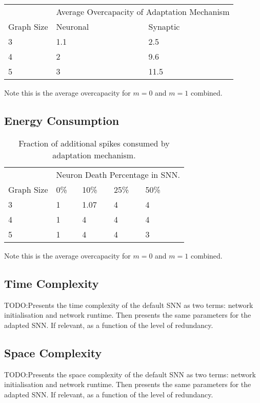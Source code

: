 \begin{table}[H]
\begin{tabular}{lll}
           & \multicolumn{2}{l}{Average Overcapacity of Adaptation Mechanism} \\ \cmidrule{2-3}
           Graph Size & Neuronal     & Synaptic                   \\ \hline 
3       & 1.1          & 2.5                        \\
4      & 2            & 9.6                          \\
5      & 3            & 11.5                         
\end{tabular}
\end{table}
Note this is the average overcapacity for $m=0$ and $m=1$ combined.

\subsection{Energy Consumption}\label{subsec:results_energy_consumption}
\begin{table}[H]
\caption{Fraction of additional spikes consumed by adaptation mechanism.}
\begin{tabular}{llllll}
           & \multicolumn{5}{l}{Neuron Death Percentage in SNN.} \\ \cmidrule{2-6} %
          Graph Size & 0\%    & 10\%    & 25\%    & 50\% \\ \hline
3      & 1    & 1.07     & 4       & 4             \\
4      & 1      & 4       & 4       & 4            \\
5      & 1      & 4       & 4       & 3           
\end{tabular}
\end{table}
Note this is the average overcapacity for $m=0$ and $m=1$ combined.

\subsection{Time Complexity}\label{subsec:time_complexity}
TODO:Presents the time complexity of the default SNN as two terms: network initialisation and network runtime. Then presents the same parameters for the adapted SNN. If relevant, as a function of the level of redundancy.

\subsection{Space Complexity}\label{subsec:space_complexity}
TODO:Presents the space complexity of the default SNN as two terms: network initialisation and network runtime. Then presents the same parameters for the adapted SNN. If relevant, as a function of the level of redundancy.
